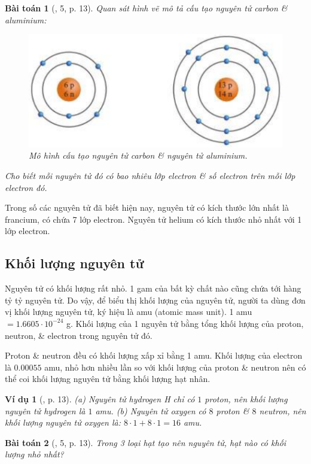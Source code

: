\documentclass{article}
\newtheorem{baitoan}{Bài toán}
\newtheorem{vidu}{Ví dụ}
\begin{document}
\begin{baitoan}[\cite{SGK_KHTN_7_Canh_Dieu}, 5, p. 13]
	Quan sát hình vẽ mô tả cấu tạo nguyên tử carbon \& aluminium:
	\begin{figure}[H]
		\centering
		\includegraphics[scale=0.4]{carbon_aluminium}
		\caption{Mô hình cấu tạo nguyên tử carbon \& nguyên tử aluminium.}
	\end{figure}
	\noindent Cho biết mỗi nguyên tử đó có bao nhiêu lớp electron \& số electron trên mỗi lớp electron đó.
\end{baitoan}
Trong số các nguyên tử đã biết hiện nay, nguyên tử có kích thước lớn nhất là francium, có chứa 7 lớp electron. Nguyên tử helium có kích thước nhỏ nhất với 1 lớp electron.

\subsection{Khối lượng nguyên tử}
Nguyên tử có khối lượng rất nhỏ. 1 gam của bất kỳ chất nào cũng chứa tới hàng tỷ tỷ nguyên tử. Do vậy, để biểu thị khối lượng của nguyên tử, người ta dùng đơn vị khối lượng nguyên tử, ký hiệu là amu (atomic mass unit). 1 amu $= 1.6605\cdot10^{-24}$ g. Khối lượng của 1 nguyên tử bằng tổng khối lượng của proton, neutron, \& electron trong nguyên tử đó.

Proton \& neutron đều có khối lượng xấp xỉ bằng 1 amu. Khối lượng của electron là $0.00055$ amu, nhỏ hơn nhiều lần so với khối lượng của proton \& neutron nên có thể coi khối lượng nguyên tử bằng khối lượng hạt nhân.

\begin{vidu}[\cite{SGK_KHTN_7_Canh_Dieu}, p. 13]
	(a) Nguyên tử hydrogen \emph{H} chỉ có $1$ proton, nên khối lượng nguyên tử hydrogen là $1$ amu. (b) Nguyên tử oxygen có $8$ proton \& $8$ neutron, nên khối lượng nguyên tử oxygen là: $8\cdot1 + 8\cdot1 = 16$ amu.
\end{vidu}

\begin{baitoan}[\cite{SGK_KHTN_7_Canh_Dieu}, 5, p. 13]
	Trong 3 loại hạt tạo nên nguyên tử, hạt nào có khối lượng nhỏ nhất?
\end{baitoan}
\end{document}

